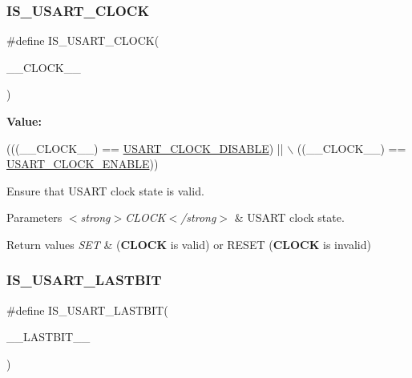 \subsubsection{\texorpdfstring{I\+S\+\_\+\+U\+S\+A\+R\+T\+\_\+\+C\+L\+O\+CK}{IS\_USART\_CLOCK}}
{\footnotesize\ttfamily \#define I\+S\+\_\+\+U\+S\+A\+R\+T\+\_\+\+C\+L\+O\+CK(\begin{DoxyParamCaption}\item[{}]{\+\_\+\+\_\+\+C\+L\+O\+C\+K\+\_\+\+\_\+ }\end{DoxyParamCaption})}

{\bfseries Value\+:}
\begin{DoxyCode}
(((\_\_CLOCK\_\_) == \hyperlink{group___u_s_a_r_t___clock_ga7c889a9b9716214fc680eb75ca18c009}{USART\_CLOCK\_DISABLE}) || \(\backslash\)
                                   ((\_\_CLOCK\_\_) == \hyperlink{group___u_s_a_r_t___clock_gac055ca6ca9647277e3f89a5df9529730}{USART\_CLOCK\_ENABLE}))
\end{DoxyCode}


Ensure that U\+S\+A\+RT clock state is valid. 


\begin{DoxyParams}{Parameters}
{\em $<$strong$>$\+C\+L\+O\+C\+K$<$/strong$>$} & U\+S\+A\+RT clock state. \\
\hline
\end{DoxyParams}

\begin{DoxyRetVals}{Return values}
{\em S\+ET} & ({\bfseries C\+L\+O\+CK} is valid) or R\+E\+S\+ET ({\bfseries C\+L\+O\+CK} is invalid) \\
\hline
\end{DoxyRetVals}
\mbox{\label{group___u_s_a_r_t___private___macros_ga56c70252e8ad4e58e739fe14c9f7f807}} 
\subsubsection{\texorpdfstring{I\+S\+\_\+\+U\+S\+A\+R\+T\+\_\+\+L\+A\+S\+T\+B\+IT}{IS\_USART\_LASTBIT}}
{\footnotesize\ttfamily \#define I\+S\+\_\+\+U\+S\+A\+R\+T\+\_\+\+L\+A\+S\+T\+B\+IT(\begin{DoxyParamCaption}\item[{}]{\+\_\+\+\_\+\+L\+A\+S\+T\+B\+I\+T\+\_\+\+\_\+ }\end{DoxyParamCaption})}

